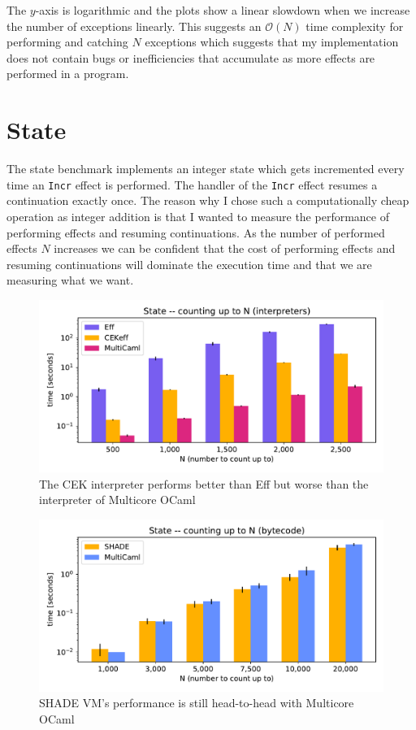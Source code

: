 \documentclass[class=article, crop=false]{standalone}
\begin{document}
The $y$-axis is logarithmic and the plots show a linear slowdown when we
increase the number of exceptions linearly. This suggests an $\mathcal{O}(N)$
time complexity for performing and catching $N$ exceptions which suggests that
my implementation does not contain bugs or inefficiencies that accumulate
as more effects are performed in a program.

\section{State}

The state benchmark implements an integer state which gets incremented every
time an \verb|Incr| effect is performed. The handler of the \verb|Incr| effect
resumes a continuation exactly once. The reason why I chose such a 
computationally cheap operation as integer addition is that I wanted to measure
the performance of performing effects and resuming continuations. As the number
of performed effects $N$ increases we can be confident that the cost of
performing effects and resuming continuations will dominate the execution time
and that we are measuring what we want.

\begin{figure}
    \centering
    \captionsetup{width=.8\linewidth}
    \includegraphics[width=.8\linewidth]{eval_plots/interp_state.pdf}
    \caption[State benchmark (interpreters)]{\small The CEK interpreter performs better than Eff but worse than the interpreter of Multicore OCaml}
    \label{fig:state-interpreters}
\end{figure}

\begin{figure}
    \centering
    \includegraphics[width=.7\linewidth]{eval_plots/comp_state.pdf}
    \caption[State benchmark (compilers)]{\small SHADE VM's performance is still head-to-head with Multicore OCaml}
    \label{fig:state-bytecode}
\end{figure}
\end{document}
